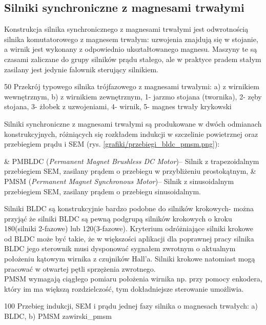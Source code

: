 \subsection{Silniki synchroniczne z magnesami trwałymi}

Konstrukcja silnika synchronicznego z magnesami trwałymi jest odwrotnością silnika komutatorowego z magnesem trwałym: uzwojenia znajdują się w stojanie, a wirnik jest wykonany z odpowiednio ukształtowanego magnesu. Maszyny te są czasami  zaliczane do grupy silników prądu stałego, ale w praktyce pradem stałym zasilany jest jedynie falownik sterujący silnikiem. 

		{50}
		{Przekrój typowego silnika trójfazowego z magnesami trwałymi: a) z wirnikiem wewnętrznym, b) z wirnikiem zewnętrznym, 1- jarzmo stojana (twornika), 2- zęby stojana, 3- żłobek z uzwojeniami, 4- wirnik, 5- magnes trwały}
		{krykowski}
		
Silniki synchroniczne z magnesami trwałymi są produkowane w dwóch odmianach konstrukcyjnych, różniących się rozkładem indukcji w szczelinie powietrznej oraz przebiegiem prądu i SEM (rys. \ref{grafiki/przebiegi_bldc_pmsm.png}):

\begin{easylist}
	& PMBLDC ({\it Permanent Magnet Brushless DC Motor})-- Silnik z trapezoidalnym przebiegiem SEM, zasilany prądem o przebiegu w przybliżeniu prostokątnym,
	& PMSM ({\it Permanent Magnet Synchronous Motor})-- Silnik z sinusoidalnym przebiegiem SEM, zasilany prądem o przebiegu sinusoidalnym.
	\\
\end{easylist} 
		
Silniki BLDC są konstrukcyjnie bardzo podobne do silników krokowych- można przyjąć że silniki BLDC są pewną podgrupą silników krokowych o kroku 180\degree (silniki 2-fazowe) lub 120\degree (3-fazowe). Kryterium odróżniające silniki krokowe od BLDC może być takie, że w większości aplikacji dla poprawnej pracy silnika BLDC jego sterownik musi dysponować sygnałem zwrotnym o aktualnym położeniu kątowym wirnika z czujników Hall'a. Silniki krokowe natomiast mogą pracować w otwartej pętli sprzężenia zwrotnego. \\

PMSM wymagają ciągłego pomiaru położenia wirnika np. przy pomocy enkodera, który im ma większą rozdzielczość, tym dokładniejsze sterowanie umożliwia.

		{100}
		{Przebieg indukcji, SEM i prądu jednej fazy silnika o magnesach trwałych: a) BLDC, b) PMSM}
		{zawirski_pmsm} 

